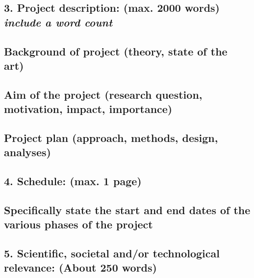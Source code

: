 \documentclass[
]{article}
\begin{document}
\hypertarget{project-description-max.-2000-words-include-a-word-count}{%
\subsection{\texorpdfstring{3. Project description: (max. 2000 words)
\emph{include a word
count}}{3. Project description: (max. 2000 words) include a word count}}\label{project-description-max.-2000-words-include-a-word-count}}

\hypertarget{background-of-project-theory-state-of-the-art}{%
\subsection{Background of project (theory, state of the
art)}\label{background-of-project-theory-state-of-the-art}}

\hypertarget{aim-of-the-project-research-question-motivation-impact-importance}{%
\subsection{Aim of the project (research question, motivation, impact,
importance)}\label{aim-of-the-project-research-question-motivation-impact-importance}}

\hypertarget{project-plan-approach-methods-design-analyses}{%
\subsection{Project plan (approach, methods, design,
analyses)}\label{project-plan-approach-methods-design-analyses}}

\hypertarget{schedule-max.-1-page}{%
\subsection{4. Schedule: (max. 1 page)}\label{schedule-max.-1-page}}

\hypertarget{specifically-state-the-start-and-end-dates-of-the-various-phases-of-the-project}{%
\subsection{Specifically state the start and end dates of the various
phases of the
project}\label{specifically-state-the-start-and-end-dates-of-the-various-phases-of-the-project}}

\hypertarget{scientific-societal-andor-technological-relevance-about-250-words}{%
\subsection{5. Scientific, societal and/or technological relevance:
(About 250
words)}\label{scientific-societal-andor-technological-relevance-about-250-words}}
\end{document}
